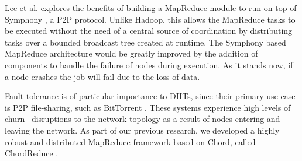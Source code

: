 \documentclass[10pt,conference]{IEEEtran}
\begin{document}
%

Lee et al. \cite{leemap} explores the benefits of building a MapReduce module to run on top of Symphony \cite{symphony},  a P2P protocol. 
 Unlike Hadoop, this allows the MapReduce tasks to be executed without the need of a central source of coordination by distributing tasks over a bounded broadcast tree created at runtime.  The Symphony based MapReduce architecture would be greatly improved by the addition of components to handle the failure of nodes during execution.  As it stands now, if a node crashes the job will fail due to the loss of data.




Fault tolerance is of particular importance to DHTs, since their primary use case is P2P file-sharing, such as BitTorrent \cite{bittorrent}.
These systems experience high levels of churn-- disruptions to the network topology as a result of nodes entering and leaving the network.
As part of our previous research, we developed a highly robust and distributed MapReduce framework based on Chord, called ChordReduce \cite{chordreduce}.
\end{document}
